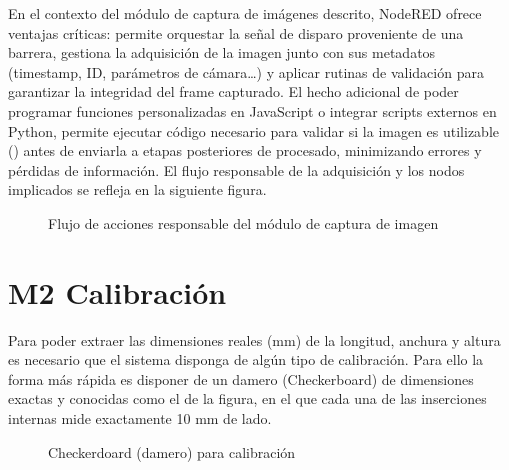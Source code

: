 \documentclass[a4paper,10pt,spanish]{jupyterBook}
\begin{document}
\sphinxAtStartPar
En el contexto del módulo de captura de imágenes descrito, Node\sphinxhyphen{}RED ofrece ventajas críticas: permite orquestar la señal de disparo proveniente de una barrera, gestiona la adquisición de la imagen junto con sus metadatos (timestamp, ID, parámetros de cámara…) y aplicar rutinas de validación para garantizar la integridad del frame capturado. El hecho adicional de poder programar funciones personalizadas en JavaScript o integrar scripts externos en Python, permite ejecutar código necesario para validar si la imagen es utilizable () antes de enviarla a etapas posteriores de procesado, minimizando errores y pérdidas de información. El flujo responsable de la adquisición y los nodos implicados se refleja en la siguiente figura.

\begin{figure}[htbp]
\centering
\capstart

\noindent{}
\caption{Flujo de acciones responsable del módulo de captura de imagen}\label{\detokenize{content/01/Modulo-1:figura-wp1-imagen-3}}\end{figure}

\sphinxstepscope


\section{M2 \sphinxhyphen{} Calibración}
\label{\detokenize{content/01/Modulo-2:m2-calibracion}}\label{\detokenize{content/01/Modulo-2::doc}}
\sphinxAtStartPar
Para poder extraer las dimensiones reales (mm) de la longitud, anchura y altura es necesario que el sistema disponga de algún tipo de calibración. Para ello la forma más rápida es disponer de un damero (Checkerboard) de dimensiones exactas y conocidas como el de la figura, en el que cada una de las inserciones internas mide exactamente 10 mm de lado.

\begin{figure}[htbp]
\centering
\capstart

\noindent{}
\caption{Checkerdoard (damero) para calibración}\label{\detokenize{content/01/Modulo-2:figura-wp1-imagen-4}}\end{figure}
\end{document}
